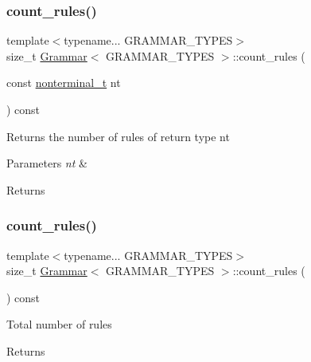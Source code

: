 \subsubsection{\texorpdfstring{count\+\_\+rules()}{count\_rules()}\hspace{0.1cm}{\footnotesize\ttfamily [1/2]}}
{\footnotesize\ttfamily template$<$typename... G\+R\+A\+M\+M\+A\+R\+\_\+\+T\+Y\+P\+ES$>$ \\
size\+\_\+t \hyperlink{class_grammar}{Grammar}$<$ G\+R\+A\+M\+M\+A\+R\+\_\+\+T\+Y\+P\+ES $>$\+::count\+\_\+rules (\begin{DoxyParamCaption}\item[{const \hyperlink{_nonterminal_8h_a1c5bfe9b903f69c83bbde5da7035fef3}{nonterminal\+\_\+t}}]{nt }\end{DoxyParamCaption}) const\hspace{0.3cm}{\ttfamily [inline]}}

Returns the number of rules of return type nt 
\begin{DoxyParams}{Parameters}
{\em nt} & \\
\hline
\end{DoxyParams}
\begin{DoxyReturn}{Returns}

\end{DoxyReturn}
\mbox{\label{class_grammar_a576605ca6ee9693b762a40c477aa4889}} 
\subsubsection{\texorpdfstring{count\+\_\+rules()}{count\_rules()}\hspace{0.1cm}{\footnotesize\ttfamily [2/2]}}
{\footnotesize\ttfamily template$<$typename... G\+R\+A\+M\+M\+A\+R\+\_\+\+T\+Y\+P\+ES$>$ \\
size\+\_\+t \hyperlink{class_grammar}{Grammar}$<$ G\+R\+A\+M\+M\+A\+R\+\_\+\+T\+Y\+P\+ES $>$\+::count\+\_\+rules (\begin{DoxyParamCaption}{ }\end{DoxyParamCaption}) const\hspace{0.3cm}{\ttfamily [inline]}}

Total number of rules \begin{DoxyReturn}{Returns}

\end{DoxyReturn}
\mbox{\label{class_grammar_a5121201035b5d5cd0a1d4251b1f73056}} 
